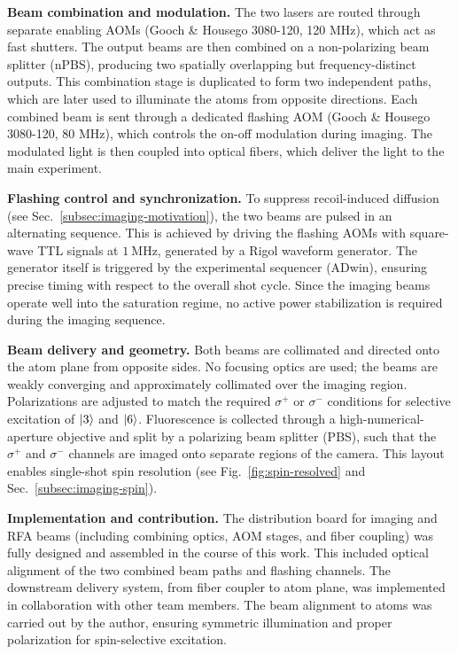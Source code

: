 \textbf{Beam combination and modulation.}  
The two lasers are routed through separate enabling AOMs (Gooch \& Housego 3080-120, 120 MHz), which act as fast shutters. The output beams are then combined on a non-polarizing beam splitter (nPBS), producing two spatially overlapping but frequency-distinct outputs. This combination stage is duplicated to form two independent paths, which are later used to illuminate the atoms from opposite directions. Each combined beam is sent through a dedicated flashing AOM (Gooch \& Housego 3080-120, 80 MHz), which controls the on-off modulation during imaging. The modulated light is then coupled into optical fibers, which deliver the light to the main experiment.

\textbf{Flashing control and synchronization.}  
To suppress recoil-induced diffusion (see Sec.~\ref{subsec:imaging-motivation}), the two beams are pulsed in an alternating sequence. This is achieved by driving the flashing AOMs with square-wave TTL signals at $1~\mathrm{MHz}$, generated by a Rigol waveform generator. The generator itself is triggered by the experimental sequencer (ADwin), ensuring precise timing with respect to the overall shot cycle. Since the imaging beams operate well into the saturation regime, no active power stabilization is required during the imaging sequence.

\textbf{Beam delivery and geometry.}  
Both beams are collimated and directed onto the atom plane from opposite sides. No focusing optics are used; the beams are weakly converging and approximately collimated over the imaging region. Polarizations are adjusted to match the required $\sigma^+$ or $\sigma^-$ conditions for selective excitation of $\left| 3 \right\rangle$ and $\left| 6 \right\rangle$. Fluorescence is collected through a high-numerical-aperture objective and split by a polarizing beam splitter (PBS), such that the $\sigma^+$ and $\sigma^-$ channels are imaged onto separate regions of the camera. This layout enables single-shot spin resolution (see Fig.~\ref{fig:spin-resolved} and Sec.~\ref{subsec:imaging-spin}).

\textbf{Implementation and contribution.}  
The distribution board for imaging and RFA beams (including combining optics, AOM stages, and fiber coupling) was fully designed and assembled in the course of this work. This included optical alignment of the two combined beam paths and flashing channels. The downstream delivery system, from fiber coupler to atom plane, was implemented in collaboration with other team members. The beam alignment to atoms was carried out by the author, ensuring symmetric illumination and proper polarization for spin-selective excitation.
